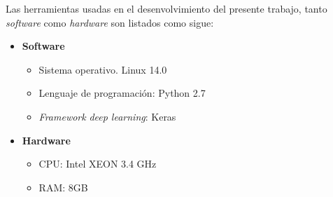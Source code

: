 Las herramientas usadas en el desenvolvimiento del presente trabajo, tanto \textit{software} como \textit{hardware} son listados como sigue:

\begin{itemize}
 \item \textbf{Software}
 \begin{itemize}
  \item Sistema operativo. Linux 14.0
  \item Lenguaje de programación: Python 2.7
  \item \textit{Framework} \textit{deep learning}: Keras
 \end{itemize}
 
 \item \textbf{Hardware}
  \begin{itemize}
   \item CPU: Intel XEON 3.4 GHz
   \item RAM: 8GB
  \end{itemize}
\end{itemize}


